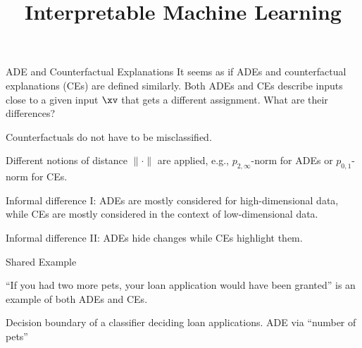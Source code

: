 \documentclass[10pt,compress,t,notes=noshow, xcolor=table]{beamer}
\title{Interpretable Machine Learning}
\begin{document}
\newcommand{\vertiii}[1]{{\left\vert\kern-0.25ex\left\vert\kern-0.25ex\left\vert #1 \right\vert\kern-0.25ex\right\vert\kern-0.25ex\right\vert}}






\begin{framev}[align=top]{ADE and Counterfactual Explanations}
It seems as if ADEs and counterfactual explanations (CEs) are defined similarly.
Both ADEs and CEs describe inputs close to a given input $\xv$ that gets a different assignment.
What are their differences?
\begin{itemizeM}
\item Counterfactuals do not have to be misclassified.
\item Different notions of distance $\|\cdot\|$ are applied, e.g., $p_{2,\infty}$-norm for ADEs or $p_{0,1}$-norm for CEs.
\item Informal difference I: ADEs are mostly considered for high-dimensional data, while CEs are mostly considered in the context of low-dimensional data.
\item Informal difference II: ADEs hide changes while CEs highlight them.
\end{itemizeM}
\end{framev}


\begin{framev}[align=top]{Shared Example }
\begin{itemizeM}
\item ``If you had two more pets, your loan application would have been granted'' is an example of both ADEs and CEs.
\end{itemizeM}
{\centering Decision boundary of a classifier deciding loan applications. ADE via ``number of pets''\par}
\end{framev}

\endlecture
\end{document}
